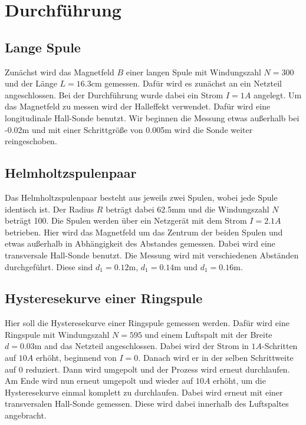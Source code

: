 \section{Durchführung}
\label{sec:Durchführung}

\subsection{Lange Spule}
\label{sec:LangeSpule}

Zunächst wird das Magnetfeld $B$ einer langen Spule mit Windungszahl $N = 300$ und der Länge $L = 16.3 \unit\cm$ gemessen.
Dafür wird es zunächst an ein Netzteil angeschlossen. Bei der Durchführung wurde dabei ein Strom $I = 1A$ angelegt.
Um das Magnetfeld zu messen wird der Halleffekt verwendet.
Dafür wird eine longitudinale Hall-Sonde benutzt.
Wir beginnen die Messung etwas außerhalb bei -0.02$\unit\m$ und mit einer Schrittgröße von 0.005$\unit\m$ wird die Sonde weiter reingeschoben.

\subsection{Helmholtzspulenpaar}
\label{sec:Spulenpaar}

Das Helmholtzspulenpaar besteht aus jeweils zwei Spulen, wobei jede Spule identisch ist.
Der Radius $R$ beträgt dabei 62.5$\unit\mm$ und die Windungszahl $N$ beträgt 100.
Die Spulen werden über ein Netzgerät mit dem Strom $I = 2.1A$ betrieben. 
Hier wird das Magnetfeld um das Zentrum der beiden Spulen und etwas außerhalb in Abhängigkeit des Abstandes gemessen.
Dabei wird eine transversale Hall-Sonde benutzt.
Die Messung wird mit verschiedenen Abständen durchgeführt.
Diese sind $d_{1} = 0.12 \unit\m$, $d_{1} = 0.14\unit\m$ und $d_{1} = 0.16\unit\m$.

\subsection{Hysteresekurve einer Ringspule}
\label{sec:Hysteresekurve}

Hier soll die Hysteresekurve einer Ringspule gemessen werden.
Dafür wird eine Ringspule mit Windungszahl $N = 595$ und einem Luftspalt mit der Breite $d = 0.03\unit\m$ and das Netzteil angeschlossen.
Dabei wird der Strom in $1A$-Schritten auf $10A$ erhöht, beginnend von $I = 0$.
Danach wird er in der selben Schrittweite auf 0 reduziert.
Dann wird umgepolt und der Prozess wird erneut durchlaufen.
Am Ende wird nun erneut umgepolt und wieder auf $10A$ erhöht, um die Hysteresekurve einmal komplett zu durchlaufen.
Dabei wird erneut mit einer transversalen Hall-Sonde gemessen.
Diese wird dabei innerhalb des Luftspaltes angebracht.